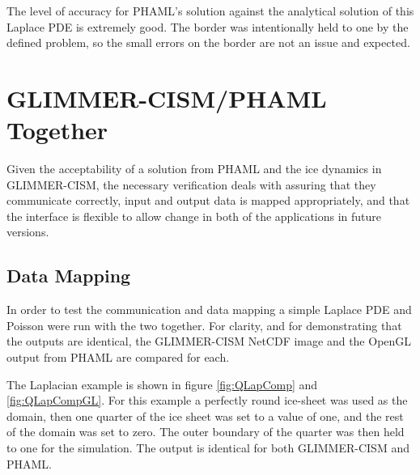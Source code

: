   
  

The level of accuracy for PHAML's solution against the analytical solution of this Laplace PDE is extremely good.  The border was intentionally held to one by the defined problem, so the small errors on the border are not an issue and expected.

\newpage

\section{GLIMMER-CISM/PHAML Together}\label{sec:chp5phamlcism}

Given the acceptability of a solution from PHAML and the ice dynamics in GLIMMER-CISM, the necessary verification deals with assuring that they communicate correctly, input and output data is mapped appropriately, and that the interface is flexible to allow change in both of the applications in future versions.

\subsection{Data Mapping}

In order to test the communication and data mapping a simple Laplace PDE and Poisson were run with the two together.  For clarity, and for demonstrating that the outputs are identical, the GLIMMER-CISM NetCDF image and the OpenGL output from PHAML are compared for each.

The Laplacian example is shown in figure \ref{fig:QLapComp} and \ref{fig:QLapCompGL}.  For this example a perfectly round ice-sheet was used as the domain, then one quarter of the ice sheet was set to a value of one, and the rest of the domain was set to zero.  The outer boundary of the quarter was then held to one for the simulation.  The output is identical for both GLIMMER-CISM and PHAML.


